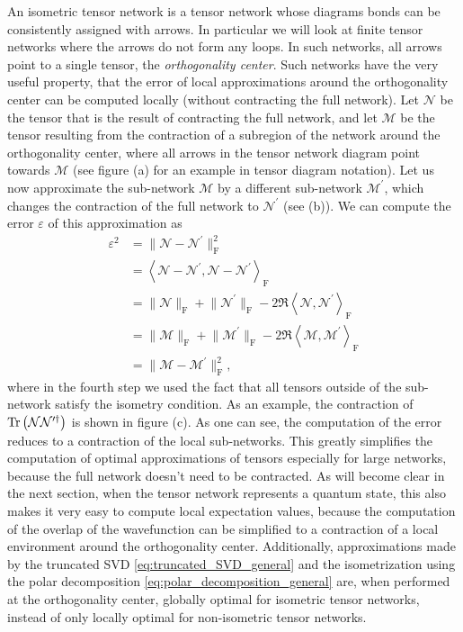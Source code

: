 An isometric tensor network is a tensor network whose diagrams bonds can be consistently assigned with arrows. In particular we will look at finite tensor networks where the arrows do not form any loops. In such networks, all arrows point to a single tensor, the \textit{orthogonality center}. Such networks have the very useful property, that the error of local approximations around the orthogonality center can be computed locally (without contracting the full network). Let $\mathcal{N}$ be the tensor that is the result of contracting the full network, and let $\mathcal{M}$ be the tensor resulting from the contraction of a subregion of the network around the orthogonality center, where all arrows in the tensor network diagram point towards $\mathcal{M}$ (see figure (a) for an example in tensor diagram notation). Let us now approximate the sub-network $\mathcal{M}$ by a different sub-network $\mathcal{M}^\prime$, which changes the contraction of the full network to $\mathcal{N}^\prime$ (see (b)). We can compute the error $\varepsilon$ of this approximation as
\begin{equation}
\begin{split}
	\varepsilon^2 &= \lVert\mathcal{N}-\mathcal{N}^\prime\rVert^2_\text{F} \\
	&=
	\left\langle\mathcal{N}-\mathcal{N}^\prime, \mathcal{N}-\mathcal{N}^\prime\right\rangle_\text{F} \\
	&= \lVert\mathcal{N}\rVert_\text{F} + \lVert\mathcal{N}^\prime\rVert_\text{F} - 2\Re\left\langle\mathcal{N},\mathcal{N}^\prime\right\rangle_\text{F} \\
	&= \lVert\mathcal{M}\rVert_\text{F} + \lVert\mathcal{M}^\prime\rVert_\text{F} - 2\Re\left\langle\mathcal{M},\mathcal{M}^\prime\right\rangle_\text{F} \\
	&= \lVert\mathcal{M}-\mathcal{M}^\prime\rVert^2_\text{F},
\end{split}
\end{equation}
where in the fourth step we used the fact that all tensors outside of the sub-network satisfy the isometry condition. As an example, the contraction of $\operatorname{Tr}\left(\mathcal{N}\mathcal{N}^{\prime\dagger}\right)$ is shown in figure (c). As one can see, the computation of the error reduces to a contraction of the local sub-networks. This greatly simplifies the computation of optimal approximations of tensors especially for large networks, because the full network doesn't need to be contracted. As will become clear in the next section, when the tensor network represents a quantum state, this also makes it very easy to compute local expectation values, because the computation of the overlap of the wavefunction can be simplified to a contraction of a local environment around the orthogonality center. Additionally, approximations made by the truncated SVD \ref{eq:truncated_SVD_general} and the isometrization using the polar decomposition \ref{eq:polar_decomposition_general} are, when performed at the orthogonality center, globally optimal for isometric tensor networks, instead of only locally optimal for non-isometric tensor networks.

